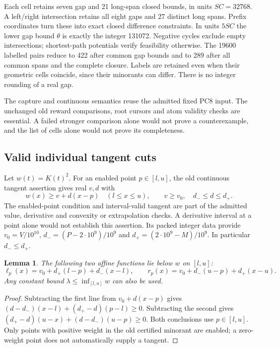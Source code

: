 \documentclass[11pt,a4paper]{article}
\newtheorem{lemma}[theorem]{Lemma}
\theoremstyle{remark}
\begin{document}
Each cell retains seven gap and 21 long-span closed bounds, in units
$SC=32768$. A left/right intersection retains all eight gaps and
27 distinct long spans. Prefix coordinates turn these into exact
closed difference constraints. In units $5SC$ the lower gap bound
$\theta$ is exactly the integer 131072. Negative cycles exclude empty
intersections; shortest-path potentials verify feasibility otherwise.
The 19600 labelled pairs reduce to 422 after common gap bounds and
to 289 after all common spans and the complete closure. Labels are
retained even when their geometric cells coincide, since their
minorants can differ. There is no integer rounding of a real gap.

The capture and continuous semantics reuse the admitted fixed PC8
input. The unchanged old reward comparisons, root cursors and atom
validity checks are essential. A failed stronger comparison alone
would not prove a counterexample, and the list of cells alone would
not prove its completeness.

\subsection{Valid individual tangent cuts}

Let $w(t)=K(t)^2$. For an enabled point $p\in[l,u]$, the old
continuous tangent assertion gives real $v,d$ with
\[
 w(x)\ge v+d(x-p)\quad(l\le x\le u),\qquad
 v\ge v_0,\quad d_-\le d\le d_+.
\]
The enabled-point condition and interval-valid tangent are part of
the admitted value, derivative and convexity or extrapolation checks.
A derivative interval at a point alone would not establish this assertion.
Its packed integer data provide $v_0=V/10^{10}$,
$d_-=(P-2\cdot10^9)/10^9$ and $d_+=(2\cdot10^9-M)/10^9$.
In particular $d_-\le d_+$.

\begin{lemma}\label{lem:cuts}
The following two affine functions lie below $w$ on $[l,u]$:
\[
 \ell_p(x)=v_0+d_+(l-p)+d_-(x-l),\qquad
 r_p(x)=v_0+d_-(u-p)+d_+(x-u).
\]
Any constant bound $\lambda\le\inf_{[l,u]}w$ can also be used.
\end{lemma}
\begin{proof}
Subtracting the first line from $v_0+d(x-p)$ gives
$(d-d_-)(x-l)+(d_+-d)(p-l)\ge0$.
Subtracting the second gives
$(d_+-d)(u-x)+(d-d_-)(u-p)\ge0$.
Both conclusions use $p\in[l,u]$. Only points with positive weight
in the old certified minorant are enabled; a zero-weight point does
not automatically supply a tangent.
\end{proof}
\end{document}
